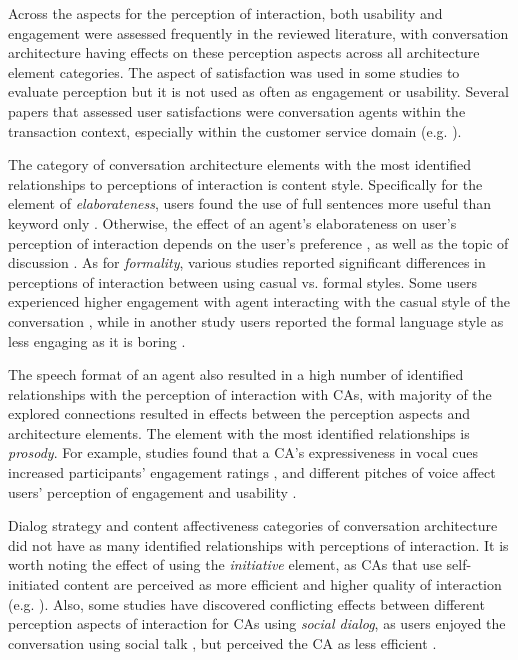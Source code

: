 Across the aspects for the perception of interaction, both usability and engagement were assessed frequently in the reviewed literature, with conversation architecture having effects on these perception aspects across all architecture element categories. The aspect of satisfaction was used in some studies to evaluate perception but it is not used as often as engagement or usability. Several papers that assessed user satisfactions were conversation agents within the transaction context, especially within the customer service domain (e.g. \cite{diederich2019emulating, elsholz2019exploring, gnewuch2018faster}\cmt{[25][61][19]}).

The category of conversation architecture elements with the most identified relationships to perceptions of interaction is content style. Specifically for the element of \textit{elaborateness}, users found the use of full sentences more useful than keyword only \cite{haas2022keep, roy2021users}\cmt{[78][71]}. Otherwise, the effect of an agent's elaborateness on user's perception of interaction depends on the user's preference \cite{miehle2018exploring}\cmt{[51]}, as well as the topic of discussion \cite{haas2022keep}\cmt{[78]}. As for \textit{formality}, various studies reported significant differences in perceptions of interaction between using casual vs. formal styles. Some users experienced higher engagement with agent interacting with the casual style of the conversation \cite{cox2022does}\cmt{[27]}, while in another study users reported the formal language style as less engaging as it is boring \cite{kim2019comparing}\cmt{[89]}.

The speech format of an agent also resulted in a high number of identified relationships with the perception of interaction with CAs, with majority of the explored connections resulted in effects between the perception aspects and architecture elements. The element with the most identified relationships is \textit{prosody}. For example, studies found that a CA's expressiveness in vocal cues increased participants' engagement ratings \cite{zhu2022effects}\cmt{[26]}, and different pitches of voice affect users' perception of engagement and usability \cite{chan2021kinvoices, habler2019effects}\cmt{[74][63]}.

Dialog strategy and content affectiveness categories of conversation architecture did not have as many identified relationships with perceptions of interaction. It is worth noting the effect of using the \textit{initiative} element, as CAs that use self-initiated content are perceived as more efficient and higher quality of interaction (e.g. \cite{cuadra2021my}\cmt{[67]}). Also, some studies have discovered conflicting effects between different perception aspects of interaction for CAs using \textit{social dialog}, as users enjoyed the conversation using social talk \cite{lee2020hear, roy2021users}\cmt{[23][71]}, but perceived the CA as less efficient \cite{roy2021users}\cmt{[71]}.

